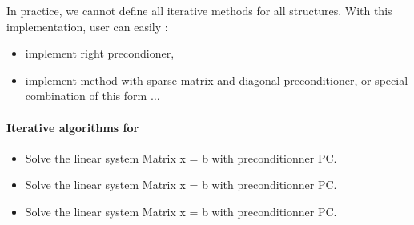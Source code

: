 In practice, we cannot define all iterative methods for all structures.
With this implementation, user can easily :
\begin{itemize}
\item implement right precondioner, 
\item implement method with sparse matrix and diagonal preconditioner, or
  special combination of this form $\dots$
\end{itemize}


\paragraph{Iterative algorithms for }


\begin{itemize}
\item {}
  \sshortdescribe Solve the linear system Matrix x = b with preconditionner PC.  
\item {}
  \sshortdescribe Solve the linear system Matrix x = b with preconditionner PC.  
\item {}
  \sshortdescribe Solve the linear system Matrix x = b with preconditionner PC.
\end{itemize}



